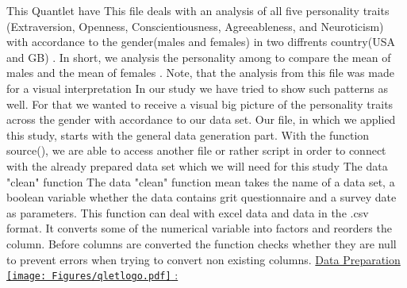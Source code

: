 This Quantlet have This file deals with an analysis of all five personality traits (Extraversion, Openness, Conscientiousness, Agreeableness, and Neuroticism) with accordance to the gender(males and females) in two diffrents  country(USA and GB) . In short, we analysis the personality among to compare the mean of males and the mean of females . Note, that the analysis from this file was made for a visual interpretation
 In our study we have tried to show such patterns as well. For that we wanted to receive a visual big picture of the personality traits across the gender with accordance to our data set. 
Our file, in which we applied this study, starts with the general data generation part. With the function source(), we are able to access another file or rather script in order to connect with the already prepared data set which we will need for this study
The data "clean" function 
The data "clean" function mean takes the name of a data set, a boolean variable whether the data contains grit questionnaire and a survey date as parameters. This function can deal with excel data and data in the .csv format. It converts some of the numerical variable into factors and reorders the column. Before columns are converted the function checks whether they are null to prevent errors when trying to convert non existing columns.
\newline
\underline{Data Preparation  \href{https://github.com/sahnouna/BIG_FIVE_PERSONALITIES/blob/master/DataPreparation.R}{\texttt{[image: Figures/qletlogo.pdf]}} :} 

